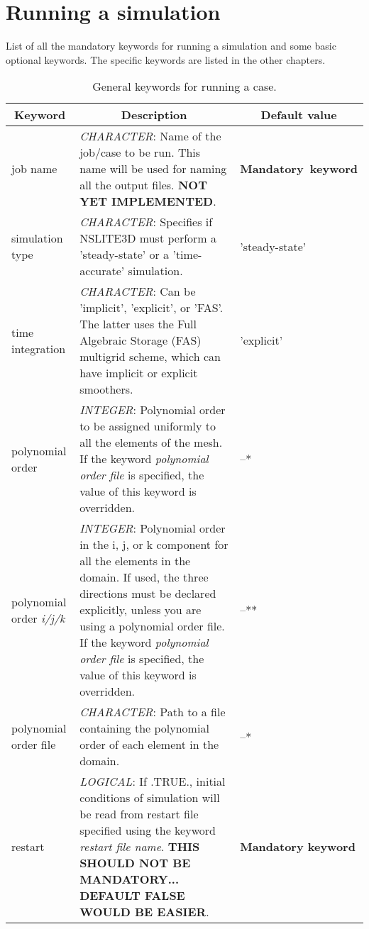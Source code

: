 \documentclass[a4paper,10pt]{report}
\begin{document}
\chapter{Running a simulation}
List of all the mandatory keywords for running a simulation and some basic optional keywords. The specific keywords are listed in the other chapters.
\begin{table}[htbp]
\caption{General keywords for running a case.}
\begin{tabular}{|l|p{10cm}|p{2.2cm}|}
\hline
\multicolumn{1}{|c|}{Keyword} & \multicolumn{1}{c|}{Description} & \multicolumn{1}{c|}{Default value} \\ \hline

job name   & \textit{CHARACTER}: Name of the job/case to be run. This name will be used for naming all the output files. \textbf{NOT YET IMPLEMENTED}. & \textbf{Mandatory\ keyword} \\ \hline

simulation type        & \textit{CHARACTER}: Specifies if NSLITE3D must perform a 'steady-state' or a 'time-accurate' simulation. &  'steady-state'\\ \hline

time integration & \textit{CHARACTER}: Can be 'implicit', 'explicit', or 'FAS'. The latter uses the Full Algebraic Storage (FAS) multigrid scheme, which can have implicit or explicit smoothers. & 'explicit' \\ \hline

polynomial order   & \textit{INTEGER}: Polynomial order to be assigned uniformly to all the elements of the mesh. If the keyword \textit{polynomial order file} is specified, the value of this keyword is overridden. & --* \\ \hline

polynomial order \textit{i/j/k}  & \textit{INTEGER}: Polynomial order in the i, j, or k component for all the elements in the domain. If used, the three directions must be declared explicitly, unless you are using a polynomial order file. If the keyword \textit{polynomial order file} is specified, the value of this keyword is overridden. & --** \\ \hline

polynomial order file  & \textit{CHARACTER}: Path to a file containing the polynomial order of each element in the domain. & --* \\ \hline

restart 			& \textit{LOGICAL}: If .TRUE., initial conditions of simulation will be read from restart file specified using the keyword \textit{restart file name}. \textbf{THIS SHOULD NOT BE MANDATORY... DEFAULT FALSE WOULD BE EASIER}. & \textbf{Mandatory keyword} \\ \hline


\end{tabular}
\end{table}
\end{document}
